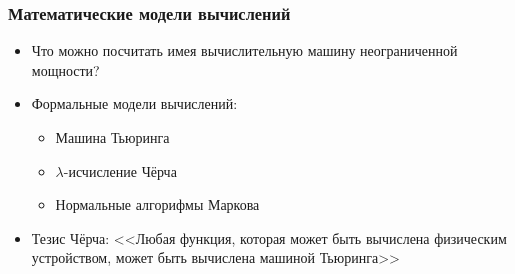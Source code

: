 \documentclass[xetex,mathserif,serif]{beamer}
\begin{document}
    \begin{frame}
        \frametitle{Математические модели вычислений}
        \begin{itemize}
            \item Что можно посчитать имея вычислительную машину неограниченной мощности?
            \item Формальные модели вычислений:
            \begin{itemize}
                \item Машина Тьюринга
                \item $\lambda$-исчисление Чёрча
                \item Нормальные алгорифмы Маркова
            \end{itemize}
            \item Тезис Чёрча: <<Любая функция, которая может быть вычислена физическим устройством, может быть вычислена машиной Тьюринга>>
        \end{itemize}
    \end{frame}
\end{document}
